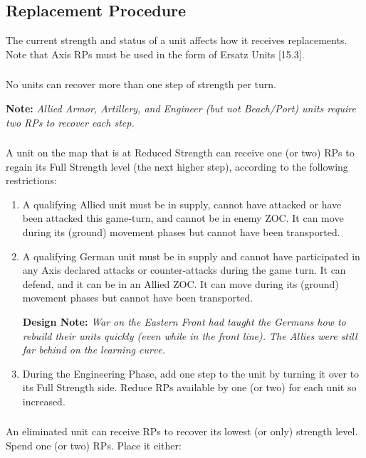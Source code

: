 \subsection{Replacement Procedure}

The current strength and status of a unit affects how it receives replacements. Note that Axis RPs must be used in the form of Ersatz Units [15.3].

\subsubsection{} No units can recover more than one step of strength per turn.

\textbf{Note:} \textit{Allied Armor, Artillery, and Engineer (but not Beach/Port) units require two RPs to recover each step.}

\subsubsection{} A unit on the map that is at Reduced Strength can receive one (or two) RPs to regain its Full Strength level (the next higher step), according to the following restrictions:

\begin{enumerate}[label=\alph*.]
    \item A qualifying Allied unit must be in supply, cannot have attacked or have been attacked this game-turn, and cannot be in enemy ZOC. It can move during its (ground) movement phases but cannot have been transported.
    \item A qualifying German unit must be in supply and cannot have participated in any Axis declared attacks or counter-attacks during the game turn. It can defend, and it can be in an Allied ZOC. It can move during its (ground) movement phases but cannot have been transported.
    
    \textbf{Design Note:} \textit{War on the Eastern Front had taught the Germans how to rebuild their units quickly (even while in the front line). The Allies were still far behind on the learning curve.}
    
    \item During the Engineering Phase, add one step to the unit by turning it over to its Full Strength side. Reduce RPs available by one (or two) for each unit so increased.
\end{enumerate}

\subsubsection{} An eliminated unit can receive RPs to recover its lowest (or only) strength level. Spend one (or two) RPs. Place it either:

